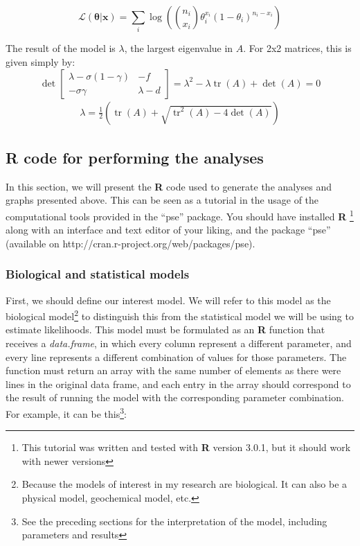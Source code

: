 \documentclass[twoside,12pt,a4paper]{article}
\newcommand{\R}{\textnormal{\sffamily\bfseries R}\xspace}
\begin{document}
\begin{equation}
\mathcal{L} \left( \boldsymbol{\theta} | \mathbf{x} \right) 
= \sum_i \log \left( {n_i \choose x_i} \theta_i^{x_i} (1-\theta_i) ^{n_i-x_i} \right) \label{eqn:loglik}
\end{equation}

The result of the model is $\lambda$, the largest eigenvalue in $A$. For 2x2 matrices, this is given simply by:
\begin{equation}
	\det \left[ 
	\begin{array}{ll} \lambda - \sigma(1-\gamma) & -f \\
		-\sigma \gamma &         \lambda - d 
	\end{array}
	\right]
	= \lambda^2 - \lambda \operatorname{tr}(A) + \operatorname{det}(A) = 0
\end{equation}
\begin{align}
	\lambda = \frac{1}{2} \left(\operatorname{tr}(A) + \sqrt{\operatorname{tr}^2(A) - 4 \operatorname{det}(A)} \right)
\end{align}

\subsection{\R code for performing the analyses}


In this section, we will present the \R code used to generate the analyses and graphs presented above.
This can be seen as a tutorial in the usage of the computational tools provided in the ``pse'' package.
You should have installed \R 
\footnote{This tutorial was written and tested with \R version 
3.0.1, but it should work with newer versions}
along with an interface and 
text editor of your liking, and the package ``pse''
(available on http://cran.r-project.org/web/packages/pse).

\subsubsection{Biological and statistical models}
First, we should define our interest model. We will refer to this model as the biological model\footnote{
Because the models of interest in my research are biological. It can also be a physical model, 
geochemical model, etc.} to distinguish this from the statistical model we will be using to 
estimate likelihoods. This model 
must be formulated as an \R function that
receives a {\em data.frame}, in which every column represent a different
parameter, and every line represents a different combination of values
for those parameters. The function must return an array with the same
number of elements as there were lines in the original data frame,
and each entry in the array should correspond to the result of running
the model with the corresponding parameter combination. For example, it can be this\footnote{See the preceding
sections for the interpretation of the model, including parameters and results}:
\end{document}
